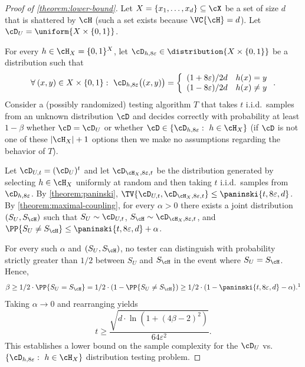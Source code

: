 \begin{proof}[Proof of \cref{theorem:lower-bound}]
	Let $X = \{x_1,\dots,x_d\} \subseteq \cX$ be a set of size $d$ that is shattered by $\cH$ (such a set exists because $\VC{\cH} = d$). Let $\cD_U = \uniform{X \times \{0,1\}}$. 
	
	For every $h \in \cH_X = \{0,1\}^X$, let $\cD_{h,8\varepsilon} \in \distribution{X \times \{0,1\}}$ be a distribution such that
	\[
		\forall \: (x,y) \in X \times \{0,1\}: ~ 
		\cD_{h,8\varepsilon}\big((x,y)\big) 
		=
		\left\{
		\begin{array}{ll}
			(1 + 8\varepsilon)/2d & h(x) = y \\
			(1 - 8\varepsilon)/2d & h(x) \neq y
		\end{array}
		\right..
	\]
	Consider a (possibly randomized) testing algorithm $T$ that takes $t$ i.i.d.\ samples from an unknown distribution $\cD$ and decides correctly with probability at least $1-\beta$ whether $\cD = \cD_U$ or whether $\cD \in \{\cD_{h,8\varepsilon}: ~ h \in \cH_X\}$ (if $\cD$ is not one of these $|\cH_X|+1$ options then we make no assumptions regarding the behavior of $T$).
	
	Let $\cD_{U,t} = (\cD_{U})^t$ and let $\cD_{\cH_X,8\varepsilon,t}$ be the distribution generated by selecting $h \in \cH_X$ uniformly at random and then taking $t$ i.i.d.\ samples from $\cD_{h,8\varepsilon}$.
	By \cref{theorem:paninski}, $\TV{\cD_{U,t}, \cD_{\cH_X,8\varepsilon,t}} \leq \paninski{t,8\varepsilon,d}$.
	By \cref{theorem:maximal-coupling}, for every $\alpha > 0$ there exists a joint distribution $(S_U,S_\cH)$ such that $S_U \sim \cD_{U,t}$, $S_\cH \sim \cD_{\cH_X,8\varepsilon,t}$, and $\PP{S_U \neq S_\cH} \leq \paninski{t,8\varepsilon,d} + \alpha$.


	For every such $\alpha$ and $(S_U,S_\cH)$, no tester can distinguish with probability strictly greater than $1/2$ between $S_U$ and $S_\cH$ in the event where $S_U = S_\cH$. 
	Hence,
	\begin{align*}
		\beta
		\geq
		1/2 \cdot \PP{S_U = S_\cH}
		=
		1/2 \cdot(1 - \PP{S_U \neq S_\cH})
		\geq
		1/2 \cdot (1-\paninski{t,8\varepsilon,d} - \alpha).\footnotemark
	\end{align*}
	Taking $\alpha \to 0$ and rearranging yields
	\begin{equation}\label{eq:testing-lower-bound-for-Dh}
		t \geq \frac{\sqrt{d \cdot \ln(1 + (4\beta - 2)^2)}}{64\varepsilon^2}.
	\end{equation}
	This establishes a lower bound on the sample complexity for the $\cD_U$ vs.\ $\{\cD_{h,8\varepsilon}: ~ h \in \cH_X\}$ distribution testing problem. 
	

\end{proof}
